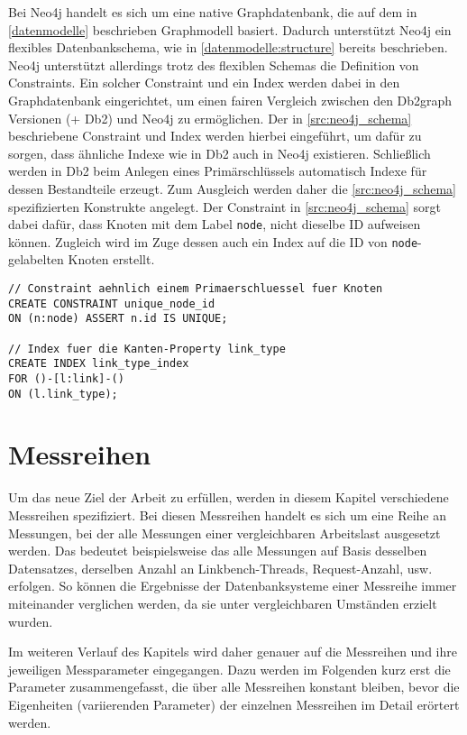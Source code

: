 Bei Neo4j handelt es sich um eine native Graphdatenbank, die auf dem in \autoref{datenmodelle} beschrieben Graphmodell basiert. Dadurch unterstützt Neo4j ein flexibles Datenbankschema, wie in \autoref{datenmodelle:structure} bereits beschrieben. Neo4j unterstützt allerdings trotz des flexiblen Schemas die Definition von Constraints. Ein solcher Constraint und ein Index werden dabei in den Graphdatenbank eingerichtet, um einen fairen Vergleich zwischen den Db2graph Versionen (+ Db2) und Neo4j zu ermöglichen. Der in \autoref{src:neo4j_schema} beschriebene Constraint und Index werden hierbei eingeführt, um dafür zu sorgen, dass ähnliche Indexe wie in Db2 auch in Neo4j existieren. Schließlich werden in Db2 beim Anlegen eines Primärschlüssels automatisch Indexe für dessen Bestandteile erzeugt. Zum Ausgleich werden daher die \autoref{src:neo4j_schema} spezifizierten Konstrukte angelegt. Der Constraint in \autoref{src:neo4j_schema} sorgt dabei dafür, dass Knoten mit dem Label \texttt{node}, nicht dieselbe ID aufweisen können. Zugleich wird im Zuge dessen auch ein Index auf die ID von \texttt{node}-gelabelten Knoten erstellt.

\begin{lstlisting}[label=src:neo4j_schema,caption={Neo4j Instanz Datenbankschema},language=CQL]
// Constraint aehnlich einem Primaerschluessel fuer Knoten
CREATE CONSTRAINT unique_node_id 
ON (n:node) ASSERT n.id IS UNIQUE;

// Index fuer die Kanten-Property link_type
CREATE INDEX link_type_index 
FOR ()-[l:link]-() 
ON (l.link_type);
\end{lstlisting}

\section{Messreihen}
\label{analyse:messreihen}
Um das neue Ziel der Arbeit zu erfüllen, werden in diesem Kapitel verschiedene Messreihen spezifiziert. Bei diesen Messreihen handelt es sich um eine Reihe an Messungen, bei der alle Messungen einer vergleichbaren Arbeitslast ausgesetzt werden. Das bedeutet beispielsweise das alle Messungen auf Basis desselben Datensatzes, derselben Anzahl an Linkbench-Threads, Request-Anzahl, usw. erfolgen. So können die Ergebnisse der Datenbanksysteme einer Messreihe immer miteinander verglichen werden, da sie unter vergleichbaren Umständen erzielt wurden.

Im weiteren Verlauf des Kapitels wird daher genauer auf die Messreihen und ihre jeweiligen Messparameter eingegangen. Dazu werden im Folgenden kurz erst die Parameter zusammengefasst, die über alle Messreihen konstant bleiben, bevor die Eigenheiten (variierenden Parameter) der einzelnen Messreihen im Detail erörtert werden.  

